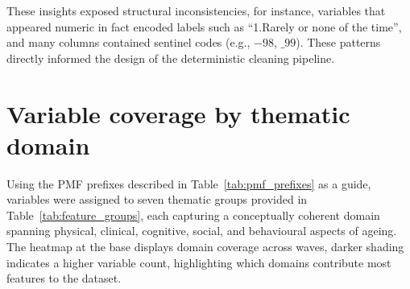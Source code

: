 These insights exposed structural inconsistencies, for instance, variables that appeared numeric in fact encoded labels such as ``1.Rarely or none of the time'', and many columns contained sentinel codes (e.g., $-98$, $\_99$). These patterns directly informed the design of the deterministic cleaning pipeline.

\section{Variable coverage by thematic domain}
Using the \gls{PMF} prefixes described in Table~\ref{tab:pmf_prefixes} as a guide, variables were assigned to seven thematic groups provided in Table~\ref{tab:feature_groups}, each capturing a conceptually coherent domain spanning physical, clinical, cognitive, social, and behavioural aspects of ageing. The heatmap at the base displays domain coverage across waves, darker shading indicates a higher variable count, highlighting which domains contribute most features to the dataset.


